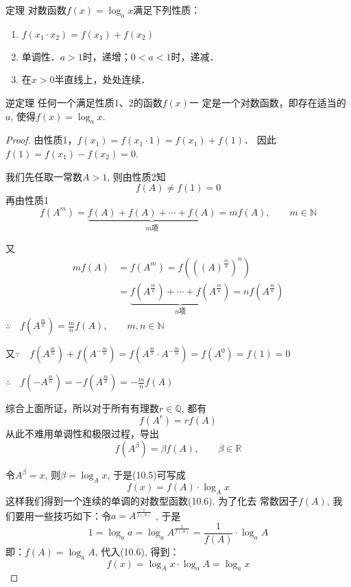 \begin{blk}{定理}
  对数函数$f(x)=\log_a x$满足下列性质：
  \begin{enumerate}
    \item $f(x_1\cdot x_2)=f(x_1)+f(x_2)$
    \item 单调性．$a>1$时，递增；$0<a<1$时，递减．
    \item 在$x>0$半直线上，处处连续．
  \end{enumerate}
\end{blk}
 
\begin{blk}{逆定理} 
  任何一个满足性质1、2的函数$f(x)$一
定是一个对数函数，即存在适当的$a$, 使得$f(x)=\log_a x$.
\end{blk}

\begin{proof}
  由性质1，$f(x_1)=f(x_1\cdot 1)=f(x_1)+f(1)$．
因此$f(1)=f(x_1)-f(x_2)=0$.

我们先任取一常数$A>1$, 则由性质2知
\[f(A)\ne f(1)=0\]
再由性质1
\[f(A^m)=\underbrace{f(A)+f(A)+\cdots+f(A)}_{\text{$m$项}}=mf(A),\qquad m\in\mathbb{N}\]

又
\[\begin{split}
  mf(A)&=f(A^m)=f\left(\left((A)^{\tfrac{m}{n}}\right)^n\right)\\
  &=\underbrace{f\left(A^{\tfrac{m}{n}}\right)+\cdots+f\left(A^{\tfrac{m}{n}}\right)}_{\text{$n$项}}=nf\left(A^{\tfrac{m}{n}}\right)
\end{split} \]
$\therefore\quad f\left(A^{\tfrac{m}{n}}\right)=\frac{m}{n}f(A),\qquad m,n\in\mathbb{N}$

又$\because\quad f\left(A^{\tfrac{m}{n}}\right)+f\left(A^{-\tfrac{m}{n}}\right)=f\left(A^{\tfrac{m}{n}}\cdot A^{-\tfrac{m}{n}}\right)=f(A^0)=f(1)=0$

$\therefore\quad f\left(-A^{\tfrac{m}{n}}\right)=-f\left(A^{\tfrac{m}{n}}\right)=-\frac{m}{n}f(A)$

综合上面所证，所以对于所有有理数$r\in\mathbb{Q}$, 都有
\[f(A^r)=rf(A)\]
从此不难用单调性和极限过程，导出
\begin{equation}
  f(A^{\beta })=\beta f(A),\qquad \beta \in\mathbb{R}
\end{equation}

令$A^{\beta }=x$, 则$\beta =\log_A x$, 于是(10.5)可写成
\begin{equation}
  f(x)=f(A)\cdot \log_A x
\end{equation}
这样我们得到一个连续的单调的对数型函数(10.6). 为了化去
常数因子$f(A)$, 我们要用一些技巧如下：令$a=A^{\tfrac{1}{f(A)}}$
, 于是
\[1=\log_a a=\log_a A^{\tfrac{1}{f(A)}}=\frac{1}{f(A)}\cdot \log_a A\]
即：$f(A)=\log_a A$, 代入(10.6), 得到：
\[f(x)=\log_A x\cdot \log_a A=\log_a x\]
\end{proof}

